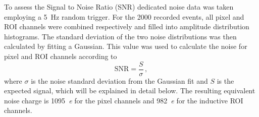 \documentclass[a4paper]{article}
\newcommand*{\m}{\mathrm}
\begin{document}
To assess the Signal to Noise Ratio (SNR) dedicated noise data was taken employing a \SI{5}{\hertz} random trigger.
For the \num{2000} recorded events, all pixel and ROI channels were combined respectively and filled into amplitude distribution histograms.
The standard deviation of the two noise distributions was then calculated by fitting a Gaussian.
This value was used to calculate the noise for pixel and ROI channels according to
\begin{equation}
\m{SNR} = \frac{S}{\sigma}\,\m{,}
\label{eq:snr}
\end{equation}
where $\sigma$ is the noise standard deviation from the Gaussian fit and $S$ is the expected signal, which will be explained in detail below.
The resulting equivalent noise charge is \SI{1095}{\elementarycharge} for the pixel channels and \SI{982}{\elementarycharge} for the inductive ROI channels.
\end{document}
